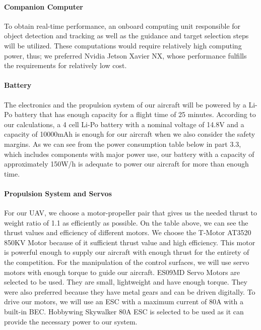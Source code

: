 \documentclass[12pt]{article}
\begin{document}
\paragraph*{Companion Computer} To obtain real-time performance, an onboard computing unit responsible for object detection and tracking as well as the guidance and target selection steps will be utilized. These computations would require relatively high computing power, thus; we preferred Nvidia Jetson Xavier NX, whose performance fulfills the requirements for relatively low cost. 

\paragraph*{Battery} The electronics and the propulsion system of our aircraft will be powered by a Li-Po battery that has enough capacity for a flight time of 25 minutes. According to our calculations, a 4 cell Li-Po battery with a nominal voltage of 14.8V and a capacity of 10000mAh is enough for our aircraft when we also consider the safety margins. As we can see from the power consumption table below in part 3.3, which includes components with major power use, our battery with a capacity of approximately 150W/h is adequate to power our aircraft for more than enough time.

\paragraph*{Propulsion System and Servos} For our UAV, we choose a motor-propeller pair that gives us the needed thrust to weight ratio of 1.1 as efficiently as possible.
\justify 
On the table above, we can see the thrust values and efficiency of different motors. We choose the T-Motor AT3520 850KV Motor because of it sufficient thrust value and high efficiency. This motor is powerful enough to supply our aircraft with enough thrust for the entirety of the competition. For the manipulation of the control surfaces, we will use servo motors with enough torque to guide our aircraft. ES09MD Servo Motors are selected to be used. They are small, lightweight and have enough torque. They were also preferred because they have metal gears and can be driven digitally. To drive our motors, we will use an ESC with a maximum current of 80A with a built-in BEC. Hobbywing Skywalker 80A ESC is selected to be used as it can provide the necessary power to our system.
\end{document}
